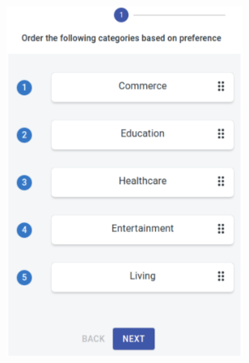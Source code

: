 \begin{figure}[h]
    \centering
    \begin{subfigure}[b]{0.3\textwidth}
        \centering
        \includegraphics[width=0.85\textwidth]{Chapters/img/backend/ui_stepper_1.png}
        \caption{\centering}
        \label{fig:ui-stepper-1}
    \end{subfigure}
    \hfill
    \begin{subfigure}[b]{0.3\textwidth}
        \centering

\end{subfigure}
\end{figure}
